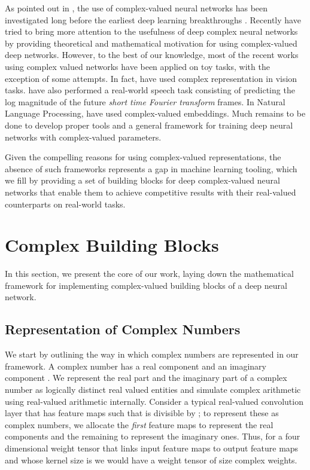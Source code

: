 \documentclass{article}
\begin{document}
As pointed out in \citet{reichert2013neuronal}, the use of complex-valued neural networks \citep{georgiou1992complex,zemel1995lending,kim2003approximation,hirose2003complex,nitta2004orthogonality} has been investigated long before the earliest deep learning breakthroughs \citep{hinton2006fast,bengio2007greedy,poultney2007efficient}. Recently \cite{reichert2013neuronal,bruna2015mathematical,arjovsky2015unitary,danihelka2016associative,wisdom2016full} have tried to bring more attention to the usefulness of deep complex neural networks by providing theoretical and mathematical motivation for using complex-valued deep networks. However, to the best of our knowledge, most of the recent works using complex valued networks have been applied on toy tasks, with the exception of some attempts. In fact, \citep{oyallon2015deep,tygert2015scale,worrall2016harmonic} have used complex representation in vision tasks. \cite{wisdom2016full} have also performed a real-world speech task consisting of predicting the log magnitude of the future \emph{short time Fourier transform} frames. In Natural Language Processing, \citep{trouillon2016complex,trouillon2017complex} have used complex-valued embeddings. Much remains to be done to develop proper tools and a general framework for training deep neural networks with complex-valued parameters.

Given the compelling reasons for using complex-valued representations, the absence of such frameworks represents a gap in machine learning tooling, which we fill by providing a set of building blocks for deep complex-valued neural networks that enable them to achieve competitive results with their real-valued counterparts on real-world tasks.

\section{Complex Building Blocks}
In this section, we present the core of our work, laying down the mathematical framework for implementing complex-valued building blocks of a deep neural network.

\subsection{Representation of Complex Numbers}
We start by outlining the way in which complex numbers are represented in our framework. A complex number  has a real component  and an imaginary component . We represent the real part  and the imaginary part  of a complex number as logically distinct real valued entities and simulate complex arithmetic using real-valued arithmetic internally. Consider a typical real-valued  convolution layer that has  feature maps such that  is divisible by ; to represent these as complex numbers, we allocate the \textit{first}  feature maps to represent the real components and the remaining  to represent the imaginary ones. Thus, for a four dimensional weight tensor  that links  input feature maps to  output feature maps and whose kernel size is  we would have a weight tensor of size  complex weights.
\end{document}
